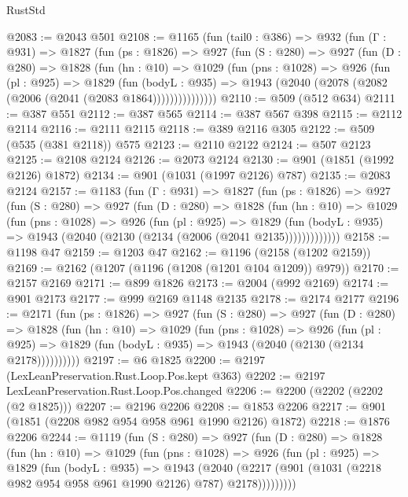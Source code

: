 \begin{lexlean}{RustStd}
\begin{coremodule}
{\begin{coremodule}
{{{{{{{{{{{{{{@2083 := @2043 @501
@2108 := @1165
    (fun (tail0 : @386) =>
    @932
      (fun (Γ : @931) =>
      @1827
        (fun (ps : @1826) =>
        @927
          (fun (S : @280) =>
          @927
            (fun (D : @280) =>
            @1828
              (fun (hn : @10) =>
              @1029
                (fun (pns : @1028) =>
                @926
                  (fun (pl : @925) =>
                  @1829
                    (fun (bodyL : @935) =>
                    @1943 (@2040 (@2078 (@2082 (@2006 (@2041 (@2083 @1864)))))))))))))))
@2110 := @509 (@512 @634)
@2111 := @387 @551
@2112 := @387 @565
@2114 := @387 @567 @398
@2115 := @2112 @2114
@2116 := @2111 @2115
@2118 := @389 @2116 @305
@2122 := @509 (@535 (@381 @2118)) @575
@2123 := @2110 @2122
@2124 := @507 @2123
@2125 := @2108 @2124
@2126 := @2073 @2124
@2130 := @901 (@1851 (@1992 @2126) @1872)
@2134 := @901 (@1031 (@1997 @2126) @787)
@2135 := @2083 @2124
@2157 := @1183
    (fun (Γ : @931) =>
    @1827
      (fun (ps : @1826) =>
      @927
        (fun (S : @280) =>
        @927
          (fun (D : @280) =>
          @1828
            (fun (hn : @10) =>
            @1029
              (fun (pns : @1028) =>
              @926
                (fun (pl : @925) =>
                @1829
                  (fun (bodyL : @935) => @1943 (@2040 (@2130 (@2134 (@2006 (@2041 @2135)))))))))))))
@2158 := @1198 @47
@2159 := @1203 @47
@2162 := @1196 (@2158 (@1202 @2159))
@2169 := @2162 (@1207 (@1196 (@1208 (@1201 @104 @1209)) @979))
@2170 := @2157 @2169
@2171 := @899 @1826
@2173 := @2004 (@992 @2169)
@2174 := @901 @2173
@2177 := @999 @2169 @1148 @2135
@2178 := @2174 @2177
@2196 := @2171
    (fun (ps : @1826) =>
    @927
      (fun (S : @280) =>
      @927
        (fun (D : @280) =>
        @1828
          (fun (hn : @10) =>
          @1029
            (fun (pns : @1028) =>
            @926
              (fun (pl : @925) =>
              @1829 (fun (bodyL : @935) => @1943 (@2040 (@2130 (@2134 @2178))))))))))
@2197 := @6 @1825
@2200 := @2197 (LexLeanPreservation.Rust.Loop.Pos.kept @363)
@2202 := @2197 LexLeanPreservation.Rust.Loop.Pos.changed
@2206 := @2200 (@2202 (@2202 (@2 @1825)))
@2207 := @2196 @2206
@2208 := @1853 @2206
@2217 := @901 (@1851 (@2208 @982 @954 @958 @961 @1990 @2126) @1872)
@2218 := @1876 @2206
@2244 := @1119
    (fun (S : @280) =>
    @927
      (fun (D : @280) =>
      @1828
        (fun (hn : @10) =>
        @1029
          (fun (pns : @1028) =>
          @926
            (fun (pl : @925) =>
            @1829
              (fun (bodyL : @935) =>
              @1943
                (@2040
                  (@2217 (@901 (@1031 (@2218 @982 @954 @958 @961 @1990 @2126) @787) @2178)))))))))
}}}}}}}}}}}}}}
\end{coremodule}}
\end{coremodule}
\end{lexlean}
